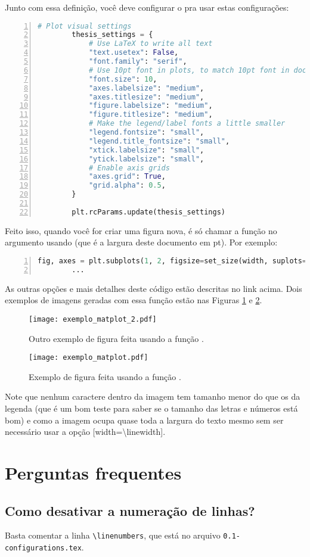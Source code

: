       Junto com essa definição, você deve configurar o  pra usar estas configurações:
      \begin{lstlisting}[label=code, language=Python, numbers=left, autogobble]          
        # Plot visual settings
        thesis_settings = {
            # Use LaTeX to write all text
            "text.usetex": False,
            "font.family": "serif",
            # Use 10pt font in plots, to match 10pt font in document
            "font.size": 10,
            "axes.labelsize": "medium",
            "axes.titlesize": "medium",
            "figure.labelsize": "medium",
            "figure.titlesize": "medium",
            # Make the legend/label fonts a little smaller
            "legend.fontsize": "small",
            "legend.title_fontsize": "small",
            "xtick.labelsize": "small",
            "ytick.labelsize": "small",
            # Enable axis grids
            "axes.grid": True,
            "grid.alpha": 0.5,
        }

        plt.rcParams.update(thesis_settings)
      \end{lstlisting}

      Feito isso, quando você for criar uma figura nova, é só chamar a função no argumento  usando  (que é a largura deste documento em pt). Por exemplo:
      \begin{lstlisting}[label=code, language=Python, numbers=left, autogobble]          
        fig, axes = plt.subplots(1, 2, figsize=set_size(width, suplots=(1, 2), fraction=1))
        ...
      \end{lstlisting}

      As outras opções e mais detalhes deste código estão descritas no link acima. Dois exemplos de imagens geradas com essa função estão nas Figuras \ref{fig:matplot_1} e \ref{fig:matplot_2}.
      \begin{figure}[h]
        \centering
        \texttt{[image: exemplo\_matplot\_2.pdf]}
        \caption{Outro exemplo de figura feita usando a função .}
        \label{fig:matplot_1}
      \end{figure}
      \begin{figure}[h]
        \centering
        \texttt{[image: exemplo\_matplot.pdf]}
        \caption{Exemplo de figura feita usando a função .}
        \label{fig:matplot_2}
      \end{figure}

      Note que nenhum caractere dentro da imagem tem tamanho menor do que os da legenda (que é um bom teste para saber se o tamanho das letras e números está bom) e como a imagem ocupa quase toda a largura do texto mesmo sem ser necessário usar a opção [width=\textbackslash linewidth].

  \section{Perguntas frequentes}
      \subsection{Como desativar a numeração de linhas?}
        Basta comentar a linha \texttt{\textbackslash linenumbers}, que está no arquivo \texttt{0.1-configurations.tex}.